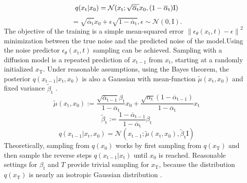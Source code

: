 \begin{equation}
\label{eq:2}
    q(x_\mathrm{t}|x_0) = \mathcal{N}(x_\mathrm{t};\sqrt{\overline{\alpha}_\mathrm{t}}x_0,(1-\overline{\alpha}_\mathrm{t})\mathrm{I}) \newline 
\end{equation}
\begin{equation}
\label{eq:3}
        = \sqrt{\overline{\alpha}_\mathrm{t}}x_0 + \epsilon\sqrt{1-\overline{\alpha}_\mathrm{t}}, \epsilon\sim \mathcal{N}(0,\mathrm{I}).
\end{equation}
The objective of the training is a simple mean-squared error ${\|\epsilon_\theta(x_\mathrm{t},t)-\epsilon\|}^2$ minimization between the true noise and the predicted noise of the model.\newline \noindent Using the noise predictor $\epsilon_{\theta}(x_\mathrm{t}, t)$ sampling can be achieved. Sampling with a diffusion model is a repeated prediction of $x_\mathrm{t-1}$ from $x_\mathrm{t}$, starting at a randomly initialized $x_\mathrm{T}$. Under reasonable assumptions, using the Bayes theorem, the posterior $q(x_\mathrm{t-1}|x_\mathrm{t},x_0)$ is also a Gaussian with mean-function $\tilde{\mu}(x_\mathrm{t},x_0)$ and fixed variance $\tilde{\beta}_\mathrm{t}$ \cite{nichol_improved_2021}. 
\begin{equation}
\label{eq:4}
    \tilde{\mu}(x_\mathrm{t},x_0):= \frac{\sqrt{\overline{\alpha}_\mathrm{t-1}}\beta_\mathrm{t}}{1-\overline{\alpha}_\mathrm{t}}x_0 + \frac{\sqrt{\alpha_\mathrm{t}}(1-\overline{\alpha}_\mathrm{t-1})}{1-\overline{\alpha}_\mathrm{t}}x_\mathrm{t}
\end{equation}
\begin{equation}
\label{eq:5}
    \tilde{\beta}_\mathrm{t} := \frac{1-\overline{\alpha}_\mathrm{t-1}}{1-\overline{\alpha}_\mathrm{t}}\beta_\mathrm{t}
\end{equation}
\begin{equation}
\label{eq:6}
    q(x_\mathrm{t-1}|x_\mathrm{t},x_0) = \mathcal{N}(x_\mathrm{t-1}; \tilde{\mu}(x_\mathrm{t},x_0),\tilde{\beta}_\mathrm{t}\mathrm{I})
\end{equation}
Theoretically, sampling from $q(x_0)$ works by first sampling from $q(x_\mathrm{T})$ and then sample the reverse steps $q(x_\mathrm{t-1}|x_\mathrm{t})$ until $x_0$ is reached. Reasonable settings for $\beta_\mathrm{t}$ and \(T\) provide trivial sampling for $x_\mathrm{T}$, because the distribution $q(x_\mathrm{T})$ is nearly an isotropic Gaussian distribution \cite{dhariwal_diffusion_2021}.\newline \noindent
